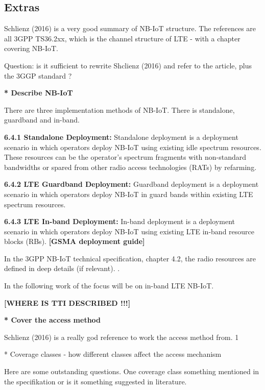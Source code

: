 \documentclass[10pt,a4paper,titlepage,twoside]{article}
\newcommand{\tilv}[1]{\textbf{\color{ymagreen} [#1]}}
\newcommand{\note}[1]{\textbf{\color{ymagray}[#1]}}
\newcommand{\point}[1]{\textbf{\color{ymared} #1}}
\begin{document}
\subsection{Extras}

Schlienz (2016) \cite{schlienz} is a very good summary of NB-IoT structure. The references are all 3GPP TS36.2xx, which is the channel structure of LTE - with a chapter covering NB-IoT.

Question: is it sufficient to rewrite Shclienz (2016) and refer to the article, plus the 3GGP standard ?

\point{* Describe NB-IoT}

There are three implementation methods of NB-IoT. There is standalone, guardband and in-band.

\textbf{6.4.1 Standalone Deployment:}
Standalone deployment is a deployment scenario in which operators deploy NB-IoT using
existing idle spectrum resources. These resources can be the operator’s spectrum
fragments with non-standard bandwidths or spared from other radio access technologies
(RATs) by refarming.

\textbf{6.4.2 LTE Guardband Deployment:}
Guardband deployment is a deployment scenario in which operators deploy NB-IoT in guard
bands within existing LTE spectrum resources.

\textbf{6.4.3 LTE In-band Deployment:}
In-band deployment is a deployment scenario in which operators deploy NB-IoT using
existing LTE in-band resource blocks (RBs).
\tilv{GSMA deployment guide}


In the 3GPP NB-IoT technical specification, chapter 4.2, the radio resources are defined in deep details (if relevant).
\cite{schlienz}.

In the following work of the focus will be on in-band LTE NB-IoT.

\note{WHERE IS TTI DESCRIBED !!!}

\point{* Cover the access method}

Schlienz (2016) is a really god reference to work the access method from.
1

* Coverage classes - how different classes affect the access mechanism

Here are some outstanding questions. One coverage class something mentioned in the specifikation or is it something suggested in literature.


\clearpage
\end{document}
